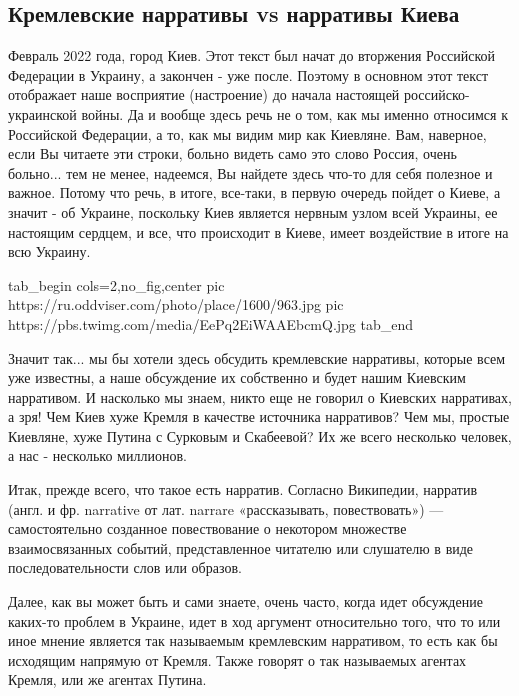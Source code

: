  
 
 
 
 

\subsection{Кремлевские нарративы vs нарративы Киева}

Февраль 2022 года, город Киев. Этот текст был начат до вторжения Российской
Федерации в Украину, а закончен - уже после. Поэтому в основном этот текст
отображает наше восприятие (настроение) до начала настоящей
российско-украинской войны. Да и вообще здесь речь не о том, как мы именно
относимся к Российской Федерации, а то, как мы видим мир как Киевляне. Вам,
наверное, если Вы читаете эти строки, больно видеть само это слово Россия,
очень больно... тем не менее, надеемся, Вы найдете здесь что-то для себя
полезное и важное. Потому что речь, в итоге, все-таки, в первую очередь пойдет
о Киеве, а значит - об Украине, поскольку Киев является нервным узлом всей
Украины, ее настоящим сердцем, и все, что происходит в Киеве, имеет воздействие
в итоге на всю Украину.

\ifcmt
  tab_begin cols=2,no_fig,center
     pic https://ru.oddviser.com/photo/place/1600/963.jpg
		 pic https://pbs.twimg.com/media/EePq2EiWAAEbcmQ.jpg
  tab_end
\fi

Значит так... мы бы хотели здесь обсудить кремлевские нарративы, которые всем
уже известны, а наше обсуждение их собственно и будет нашим Киевским
нарративом.  И насколько мы знаем, никто еще не говорил о Киевских нарративах,
а зря! Чем Киев хуже Кремля в качестве источника нарративов? Чем мы, простые
Киевляне, хуже Путина с Сурковым и Скабеевой? Их же всего несколько человек, а
нас - несколько миллионов.

Итак, прежде всего, что такое есть нарратив. Согласно Википедии, нарратив
(англ. и фр. narrative от лат. narrare «рассказывать, повествовать») —
самостоятельно созданное повествование о некотором множестве взаимосвязанных
событий, представленное читателю или слушателю в виде последовательности слов
или образов.

Далее, как вы может быть и сами знаете, очень часто, когда идет обсуждение
каких-то проблем в Украине, идет в ход аргумент относительно того, что то или
иное мнение является так называемым кремлевским нарративом, то есть как бы
исходящим напрямую от Кремля. Также говорят о так называемых агентах Кремля,
или же агентах Путина.

